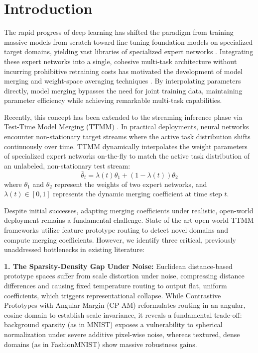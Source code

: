 \documentclass{article}
\theoremstyle{plain}
\theoremstyle{definition}
\theoremstyle{remark}
\begin{document}
\section{Introduction}
\label{sec:intro}

The rapid progress of deep learning has shifted the paradigm from training massive models from scratch toward fine-tuning foundation models on specialized target domains, yielding vast libraries of specialized expert networks \cite{wortsman2022model}. Integrating these expert networks into a single, cohesive multi-task architecture without incurring prohibitive retraining costs has motivated the development of model merging and weight-space averaging techniques \cite{ilharco2023editing, yadav2023ties, jin2023regmean}. By interpolating parameters directly, model merging bypasses the need for joint training data, maintaining parameter efficiency while achieving remarkable multi-task capabilities.

Recently, this concept has been extended to the streaming inference phase via Test-Time Model Merging (TTMM) \cite{yang2024test, hubotter2026coacting}. In practical deployments, neural networks encounter non-stationary target streams where the active task distribution shifts continuously over time. TTMM dynamically interpolates the weight parameters of specialized expert networks on-the-fly to match the active task distribution of an unlabeled, non-stationary test stream:
\begin{equation}
  \bar{\theta}_t = \lambda(t)\theta_1 + (1 - \lambda(t))\theta_2
\end{equation}
where $\theta_1$ and $\theta_2$ represent the weights of two expert networks, and $\lambda(t) \in [0, 1]$ represents the dynamic merging coefficient at time step $t$.

Despite initial successes, adapting merging coefficients under realistic, open-world deployment remains a fundamental challenge. State-of-the-art open-world TTMM frameworks utilize feature prototype routing to detect novel domains and compute merging coefficients. However, we identify three critical, previously unaddressed bottlenecks in existing literature:

\textbf{1. The Sparsity-Density Gap Under Noise:} Euclidean distance-based prototype spaces suffer from scale distortion under noise, compressing distance differences and causing fixed temperature routing to output flat, uniform coefficients, which triggers representational collapse. While Contrastive Prototypes with Angular Margin (CP-AM) reformulates routing in an angular, cosine domain to establish scale invariance, it reveals a fundamental trade-off: background sparsity (as in MNIST) exposes a vulnerability to spherical normalization under severe additive pixel-wise noise, whereas textured, dense domains (as in FashionMNIST) show massive robustness gains.
\end{document}

